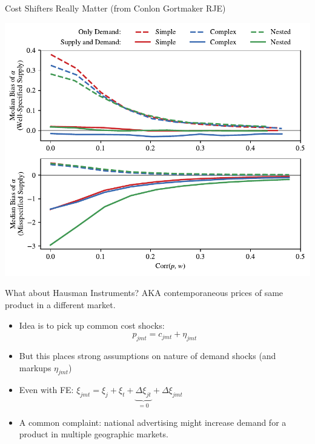 \begin{frame}{Cost Shifters Really Matter (from Conlon Gortmaker RJE)}
\begin{center}
    \includegraphics[height=0.95\textheight]{../demand/resources/strength_blp_approximate_bias_alpha_plot.pdf}
\end{center}
\end{frame}


\begin{frame}{What about Hausman Instruments?}
AKA contemporaneous prices of same product in a different market.
\begin{itemize}
    \item Idea is to pick up common cost shocks:
     $$p_{jmt} = c_{jmt} + \eta_{jmt}$$
     \item But this places strong assumptions on nature of demand shocks (and markups $ \eta_{jmt}$)
     \item Even with FE: $\xi_{jmt} = \xi_j + \xi_t + \underbrace{\Delta \xi_{jt}}_{=0} + \Delta \xi_{jmt}$
     \item A common complaint: national advertising might increase demand for a product in multiple geographic markets.
\end{itemize}
\end{frame}



